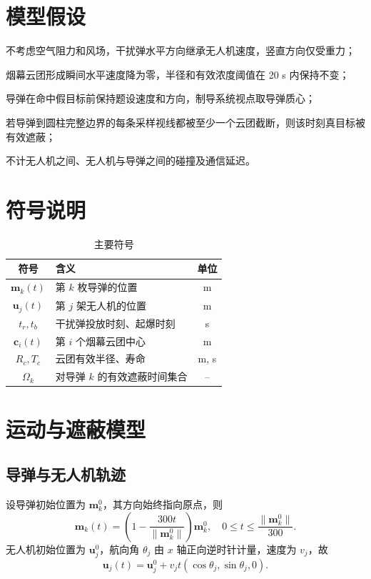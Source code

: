 \documentclass[12pt]{article}
\begin{document}
\section{模型假设}

\begin{modelassumptions}
  \item 不考虑空气阻力和风场，干扰弹水平方向继承无人机速度，竖直方向仅受重力；
  \item 烟幕云团形成瞬间水平速度降为零，半径和有效浓度阈值在 20 s 内保持不变；
  \item 导弹在命中假目标前保持题设速度和方向，制导系统视点取导弹质心；
  \item 若导弹到圆柱完整边界的每条采样视线都被至少一个云团截断，则该时刻真目标被有效遮蔽；
  \item 不计无人机之间、无人机与导弹之间的碰撞及通信延迟。
\end{modelassumptions}

\section{符号说明}
\begin{table}[!htbp]
\centering\small
\caption{主要符号}
\begin{tabular}{clc}
\toprule
符号 & 含义 & 单位 \\
\midrule
$\boldsymbol m_k(t)$ & 第 $k$ 枚导弹的位置 & m \\
$\boldsymbol u_j(t)$ & 第 $j$ 架无人机的位置 & m \\
$t_r,t_b$ & 干扰弹投放时刻、起爆时刻 & s \\
$\boldsymbol c_i(t)$ & 第 $i$ 个烟幕云团中心 & m \\
$R_c,T_c$ & 云团有效半径、寿命 & m, s \\
$\Omega_k$ & 对导弹 $k$ 的有效遮蔽时间集合 & -- \\
\bottomrule
\end{tabular}
\end{table}

\section{运动与遮蔽模型}

\subsection{导弹与无人机轨迹}

设导弹初始位置为 $\boldsymbol m_k^0$，其方向始终指向原点，则
\begin{equation}
\boldsymbol m_k(t)=\left(1-\frac{300t}{\|\boldsymbol m_k^0\|}\right)\boldsymbol m_k^0,
\quad 0\le t\le \frac{\|\boldsymbol m_k^0\|}{300}.
\end{equation}
无人机初始位置为 $\boldsymbol u_j^0$，航向角 $\theta_j$ 由 $x$ 轴正向逆时针计量，速度为 $v_j$，故
\begin{equation}
\boldsymbol u_j(t)=\boldsymbol u_j^0+v_jt(\cos\theta_j,\sin\theta_j,0).
\end{equation}
\end{document}
